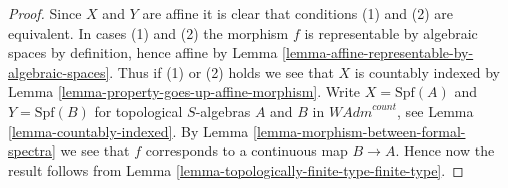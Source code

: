 \documentclass{stacks-project}
\theoremstyle{plain}
\theoremstyle{definition}
\theoremstyle{remark}
\numberwithin{equation}{subsection}
\begin{document}
\begin{proof}
Since $X$ and $Y$ are affine it is clear that conditions (1)
and (2) are equivalent. In cases (1) and (2) the morphism $f$
is representable by algebraic spaces by definition, hence
affine by Lemma \ref{lemma-affine-representable-by-algebraic-spaces}.
Thus if (1) or (2) holds we see that
$X$ is countably indexed by
Lemma \ref{lemma-property-goes-up-affine-morphism}.
Write $X = \text{Spf}(A)$ and $Y = \text{Spf}(B)$
for topological $S$-algebras $A$ and $B$ in $\textit{WAdm}^{count}$, see
Lemma \ref{lemma-countably-indexed}. By
Lemma \ref{lemma-morphism-between-formal-spectra}
we see that $f$ corresponds to a continuous map $B \to A$.
Hence now the result follows from
Lemma \ref{lemma-topologically-finite-type-finite-type}.
\end{proof}
\end{document}
